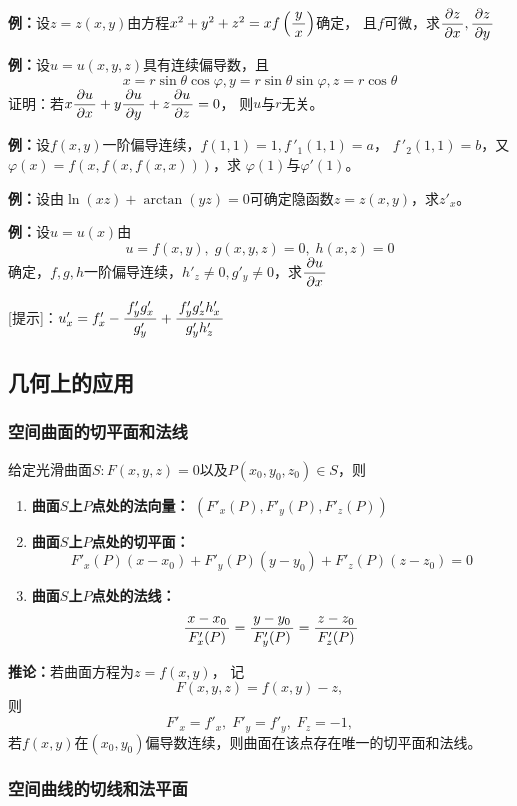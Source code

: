 {\bf 例：}设$z=z(x,y)$由方程$x^2+y^2+z^2=xf\left(\displaystyle\frac{\,{y}\,}{\,{x}\,}\right)$确定，
且$f$可微，求$\displaystyle\frac{\,{\partial z}\,}{\,{\partial x}\,},\displaystyle\frac{\,{\partial z}\,}{\,{\partial y}\,}$


{\bf 例：}设$u=u(x,y,z)$具有连续偏导数，且
$$x=r\sin\theta\cos\varphi,y=r\sin\theta\sin\varphi,z=r\cos\theta$$
证明：若$x\displaystyle\frac{\,{\partial u}\,}{\,{\partial x}\,}+y\displaystyle\frac{\,{\partial u}\,}{\,{\partial y}\,}+z\displaystyle\frac{\,{\partial u}\,}{\,{\partial z}\,}=0$，
则$u$与$r$无关。

{\bf 例：}设$f(x,y)$一阶偏导连续，$f(1,1)=1,f\,'_1(1,1)=a$，
$f\,'_2(1,1)=b$，又$\varphi(x)=f(x,f(x,f(x,x)))$，求
$\varphi(1)$与$\varphi'(1)$。

{\bf 例：}设由$\ln(xz)+\arctan(yz)=0$可确定隐函数$z=z(x,y)$，求$z'_x$。

{\bf 例：}设$u=u(x)$由
$$u=f(x,y),\;g(x,y,z)=0,\;h(x,z)=0$$
确定，$f,g,h$一阶偏导连续，$h'_z\ne0,g'_y\ne0$，求$\displaystyle\frac{\,{\partial u}\,}{\,{\partial x}\,}$

[提示]：$u'_x=f'_x-\displaystyle\frac{\,{f'_yg'_x}\,}{\,{g'_y}\,}+\displaystyle\frac{\,{f'_yg'_zh'_x}\,}{\,{g'_yh'_z}\,}$

\subsection{几何上的应用}

\subsubsection{空间曲面的切平面和法线}

\begin{thx}
	给定光滑曲面$S:F(x,y,z)=0$以及$P(x_0,y_0,z_0)\in S$，则
	\begin{enumerate}
	  \item {\bf 曲面$S$上$P$点处的法向量：} ${(F'_x(P),F'_y(P),F'_z(P))}$ 
	  \item {\bf 曲面$S$上$P$点处的切平面：}
	  	$$F'_x(P)(x-x_0)+F'_y(P)(y-y_0)+F'_z(P)(z-z_0)=0$$ 
	  \item {\bf 曲面$S$上$P$点处的法线：}
	  	$$\displaystyle\frac{\,{x-x_0}\,}{\,{F'_x(P)}\,}=\displaystyle\frac{\,{y-y_0}\,}{\,{F'_y(P)}\,}=\displaystyle\frac{\,{z-z_0}\,}{\,{F'_z(P)}\,}$$
	\end{enumerate}
\end{thx}

\begin{thx}
	{\bf 推论：}若曲面方程为$z=f(x,y)$， 记
	$$F(x,y,z)=f(x,y)-z,$$
	则
	$$F'_x=f'_x,\;F'_y=f'_y,\;F_z=-1,$$
	若$f(x,y)$在$(x_0,y_0)$偏导数连续，则曲面在该点存在唯一的切平面和法线。
\end{thx}

\subsubsection{空间曲线的切线和法平面}

